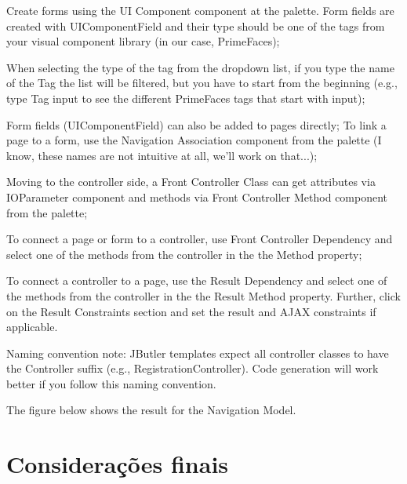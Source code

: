 \documentclass[
article,			%
11pt,				%
oneside,			%
a4paper,			%
english,			%
brazil,				%
sumario=tradicional
]{abntex2}
\begin{document}
Create forms using the UI Component component at the palette. Form fields are created with UIComponentField and their type should be one of the tags from your visual component library (in our case, PrimeFaces);

When selecting the type of the tag from the dropdown list, if you type the name of the Tag the list will be filtered, but you have to start from the beginning (e.g., type Tag input to see the different PrimeFaces tags that start with input);

Form fields (UIComponentField) can also be added to pages directly;
To link a page to a form, use the Navigation Association component from the palette (I know, these names are not intuitive at all, we'll work on that...);

Moving to the controller side, a Front Controller Class can get attributes via IOParameter component and methods via Front Controller Method component from the palette;

To connect a page or form to a controller, use Front Controller Dependency and select one of the methods from the controller in the the Method property;

To connect a controller to a page, use the Result Dependency and select one of the methods from the controller in the the Result Method property. Further, click on the Result Constraints section and set the result and AJAX constraints if applicable.

Naming convention note: JButler templates expect all controller classes to have the Controller suffix (e.g., RegistrationController). Code generation will work better if you follow this naming convention.

The figure below shows the result for the Navigation Model.

	\section{Considerações finais}
	
	\lipsum[1]
	
	\begin{citacao}
		\lipsum[2]
	\end{citacao}
	
	\lipsum[3]
	
	\postextual
	
	
	
\end{document}
